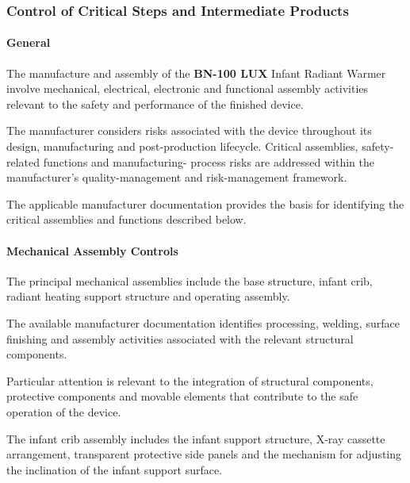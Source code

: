 ﻿

\hypertarget{p3-2-2-4}{}

\subsubsection{Control of Critical Steps and Intermediate Products}

\paragraph{General}

The manufacture and assembly of the \textbf{BN-100 LUX} Infant
Radiant Warmer involve mechanical, electrical, electronic and
functional assembly activities relevant to the safety and
performance of the finished device.

The manufacturer considers risks associated with the device
throughout its design, manufacturing and post-production lifecycle.
Critical assemblies, safety-related functions and manufacturing-
process risks are addressed within the manufacturer's
quality-management and risk-management framework.

The applicable manufacturer documentation provides the basis for
identifying the critical assemblies and functions described below.

\paragraph{Mechanical Assembly Controls}

The principal mechanical assemblies include the base structure,
infant crib, radiant heating support structure and operating assembly.

The available manufacturer documentation identifies processing,
welding, surface finishing and assembly activities associated with
the relevant structural components.

Particular attention is relevant to the integration of structural
components, protective components and movable elements that
contribute to the safe operation of the device.

The infant crib assembly includes the infant support structure,
X-ray cassette arrangement, transparent protective side panels
and the mechanism for adjusting the inclination of the infant
support surface.

